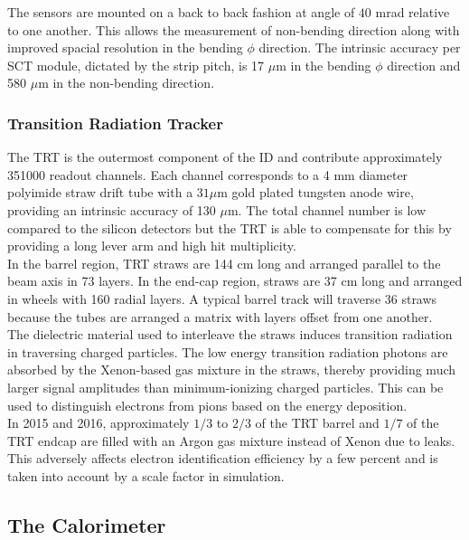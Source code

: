 \indent The sensors are mounted on a back to back fashion at angle of $40$ mrad relative to one another.  This allows the measurement of non-bending direction along with improved spacial resolution in the bending $\phi$ direction. The intrinsic accuracy per SCT module, dictated by the strip pitch, is 17 $\mu$m in the bending $\phi$ direction and 580 $\mu$m in the non-bending direction.\\

\subsubsection*{Transition Radiation Tracker}

\indent The TRT is the outermost component of the ID and contribute approximately 351000 readout channels.  Each channel corresponds to a 4 mm diameter polyimide straw drift tube with a $31 \mu$m gold plated tungsten anode wire, providing an intrinsic accuracy of 130 $\mu$m.  The total channel number is low compared to the silicon detectors but the TRT is able to compensate for this by providing a long lever arm and high hit multiplicity.  \\

\indent In the barrel region, TRT straws are 144 cm long and arranged parallel to the beam axis in 73 layers. In the end-cap region, straws are 37 cm long and arranged in wheels with 160 radial layers.  A typical barrel track will traverse 36 straws because the tubes are arranged a matrix with layers offset from one another.\\

\indent The dielectric material used to interleave the straws induces transition radiation in traversing charged particles.  The low energy transition radiation photons are absorbed by the Xenon-based gas mixture in the straws, thereby providing much larger signal amplitudes than minimum-ionizing charged particles.  This can be used to distinguish electrons from pions based on the energy deposition.  \\

\indent In 2015 and 2016, approximately $1/3$ to $2/3$ of the TRT barrel and $1/7$ of the TRT endcap are filled with an Argon gas mixture instead of Xenon due to leaks.  This adversely affects electron identification efficiency by a few percent and is taken into account by a scale factor in simulation.  \\

\subsection{The Calorimeter}
\label{LHC:Calorimeter}

